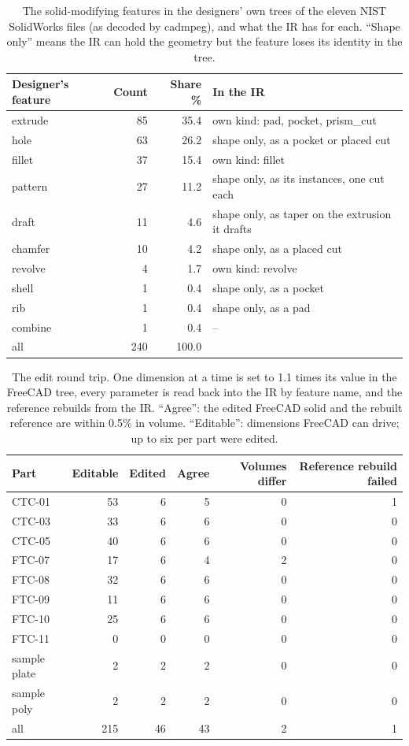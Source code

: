 \begin{table}[t]
\centering\small
\begin{tabular}{@{}lrrl@{}}
\toprule
Designer's feature & Count & Share \% & In the IR \\
\midrule
extrude & 85 & 35.4 & own kind: pad, pocket, prism\_cut \\
hole & 63 & 26.2 & shape only, as a pocket or placed cut \\
fillet & 37 & 15.4 & own kind: fillet \\
pattern & 27 & 11.2 & shape only, as its instances, one cut each \\
draft & 11 & 4.6 & shape only, as taper on the extrusion it drafts \\
chamfer & 10 & 4.2 & shape only, as a placed cut \\
revolve & 4 & 1.7 & own kind: revolve \\
shell & 1 & 0.4 & shape only, as a pocket \\
rib & 1 & 0.4 & shape only, as a pad \\
combine & 1 & 0.4 & -- \\
\midrule
all & 240 & 100.0 & \\
\bottomrule
\end{tabular}
\caption{The solid-modifying features in the designers' own trees of the eleven NIST SolidWorks files (as decoded by cadmpeg), and what the IR has for each. ``Shape only'' means the IR can hold the geometry but the feature loses its identity in the tree.}
\label{tab:vocab}
\end{table}

\begin{table}[t]
\centering\small
\begin{tabular}{@{}lrrrrr@{}}
\toprule
Part & Editable & Edited & Agree & Volumes differ & Reference rebuild failed \\
\midrule
CTC-01 & 53 & 6 & 5 & 0 & 1 \\
CTC-03 & 33 & 6 & 6 & 0 & 0 \\
CTC-05 & 40 & 6 & 6 & 0 & 0 \\
FTC-07 & 17 & 6 & 4 & 2 & 0 \\
FTC-08 & 32 & 6 & 6 & 0 & 0 \\
FTC-09 & 11 & 6 & 6 & 0 & 0 \\
FTC-10 & 25 & 6 & 6 & 0 & 0 \\
FTC-11 & 0 & 0 & 0 & 0 & 0 \\
sample plate & 2 & 2 & 2 & 0 & 0 \\
sample poly & 2 & 2 & 2 & 0 & 0 \\
\midrule
all & 215 & 46 & 43 & 2 & 1 \\
\bottomrule
\end{tabular}
\caption{The edit round trip. One dimension at a time is set to 1.1 times its value in the FreeCAD tree, every parameter is read back into the IR by feature name, and the reference rebuilds from the IR. ``Agree'': the edited FreeCAD solid and the rebuilt reference are within 0.5\% in volume. ``Editable'': dimensions FreeCAD can drive; up to six per part were edited.}
\label{tab:nudge}
\end{table}
